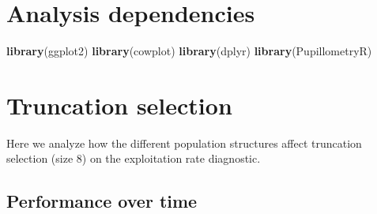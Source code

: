 \documentclass[]{book}
\newenvironment{Shaded}{\begin{snugshade}}{\end{snugshade}}
\newcommand{\KeywordTok}[1]{\textcolor[rgb]{0.13,0.29,0.53}{\textbf{#1}}}
\newcommand{\NormalTok}[1]{#1}
\begin{document}
\hypertarget{analysis-dependencies-8}{%
\section{Analysis dependencies}\label{analysis-dependencies-8}}

\begin{Shaded}
\begin{Highlighting}[]
\KeywordTok{library}\NormalTok{(ggplot2)}
\KeywordTok{library}\NormalTok{(cowplot)}
\KeywordTok{library}\NormalTok{(dplyr)}
\KeywordTok{library}\NormalTok{(PupillometryR)}
\end{Highlighting}
\end{Shaded}

\hypertarget{truncation-selection-8}{%
\section{Truncation selection}\label{truncation-selection-8}}

Here we analyze how the different population structures affect truncation selection (size 8) on the exploitation rate diagnostic.

\hypertarget{performance-over-time-18}{%
\subsection{Performance over time}\label{performance-over-time-18}}
\end{document}
